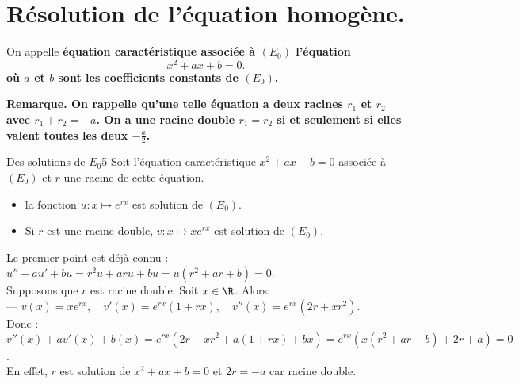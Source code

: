 \documentclass[11pt]{article}
\begin{document}
\pagebreak

\section{Résolution de l'équation homogène.}

\begin{defi}{}{}
    On appelle \bf{équation caractéristique} associée à $(E_0)$ l'équation
    \begin{equation*}
        x^2 + ax + b = 0.
    \end{equation*}
    où $a$ et $b$ sont les coefficients constants de $(E_0)$.
\end{defi}

\bf{Remarque.} On rappelle qu'une telle équation a deux racines $r_1$ et $r_2$ avec $r_1+r_2=-a$. On a une racine double $r_1=r_2$ si et seulement si elles valent toutes les deux $-\frac{a}{2}$.

\begin{lemme}{Des solutions de $E_0$}{5}
    Soit l'équation caractéristique $x^2+ax+b=0$ associée à $(E_0)$ et $r$ une racine de cette équation.
    \begin{itemize}
        \item la fonction $u:x\mapsto e^{rx}$ est solution de $(E_0)$.
        \item Si $r$ est une racine double, $v:x\mapsto xe^{rx}$ est solution de $(E_0)$.
    \end{itemize}
    \tcblower
    Le premier point est déjà connu : $u''+au'+bu=r^2u+aru+bu=u(r^2+ar+b)=0$.\\
    Supposons que $r$ est racine double. Soit $x\in\R$. Alors:\\
    --- $v(x)=xe^{rx},\quad v'(x)=e^{rx}(1+rx), \quad v''(x)=e^{rx}(2r+xr^2)$.\\
    Donc : $v''(x)+av'(x)+b(x)=e^{rx}(2r+xr^2+a(1+rx)+bx)=e^{rx}(x(r^2+ar+b) + 2r + a)=0$.\\
    En effet, $r$ est solution de $x^2+ax+b=0$ et $2r=-a$ car racine double. 
\end{lemme}
\end{document}

